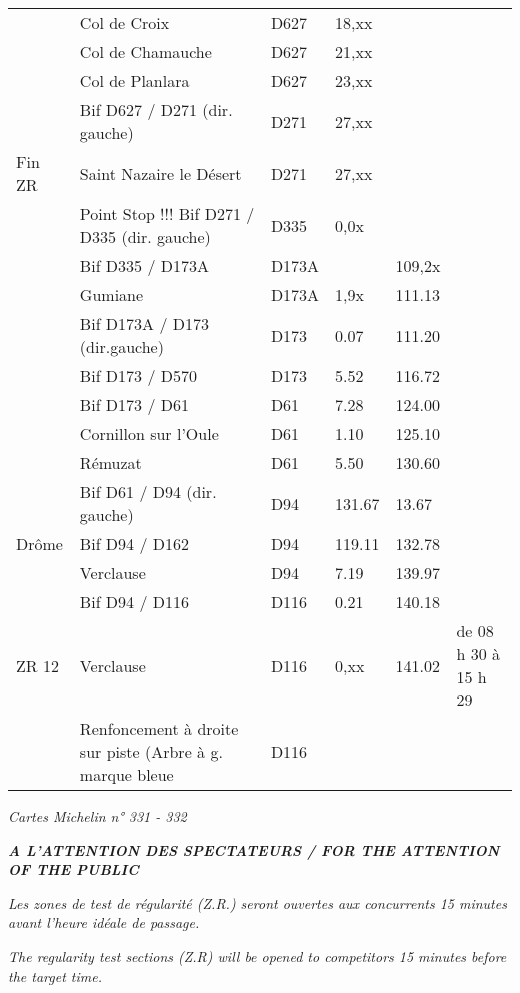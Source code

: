 \documentclass{article}%
\begin{document}
\begin{longtable}{p{2.25cm}|p{7.0cm}|p{1.5cm}|p{1.5cm}|p{1.5cm}|p{3.5cm}}
&Col de Croix  &D627&18,xx&&\\%
&Col de Chamauche &D627&21,xx&&\\%
&Col de Planlara&D627&23,xx&&\\%
&Bif D627 / D271 (dir. gauche)&D271&27,xx&&\\%
Fin ZR&Saint Nazaire le Désert&D271& 27,xx &&\\%
&Point Stop !!! Bif D271 / D335 (dir. gauche)&D335& 0,0x &&\\%
&Bif D335 / D173A&D173A&&109,2x&\\%
&Gumiane&D173A&1,9x&111.13&\\%
&Bif D173A / D173 (dir.gauche)&D173&0.07&111.20&\\%
&Bif D173 / D570&D173&5.52&116.72&\\%
&Bif D173 / D61&D61&7.28&124.00&\\%
&Cornillon sur l'Oule&D61 &1.10&125.10&\\%
&Rémuzat &D61&5.50&130.60&\\%
&Bif D61 / D94 (dir. gauche)&D94&131.67&13.67&\\%
Drôme &Bif D94 / D162 &D94 &119.11&132.78&\\%
&Verclause &D94&7.19&139.97&\\%
&Bif D94 / D116 &D116&0.21&140.18&\\%
ZR 12&Verclause &D116&0,xx&141.02&de 08 h 30 à 15 h 29\\%
&Renfoncement à droite sur piste (Arbre à g. marque bleue&D116&&&\\%
\hline%
\end{longtable}%
\begin{flushleft} \textit{Cartes Michelin n° 331 - 332} \end{flushleft}%
\begin{center} \textit{\textbf{A L’ATTENTION DES SPECTATEURS / FOR THE ATTENTION OF THE PUBLIC }} \end{center}%
\begin{center} \textit{Les zones de test de régularité (Z.R.) seront ouvertes aux concurrents 15 minutes avant l’heure idéale de passage.} \end{center}%
\begin{center} \textit{The regularity test sections (Z.R) will be opened to competitors 15 minutes before the target time.
} \end{center}%
\end{document}
